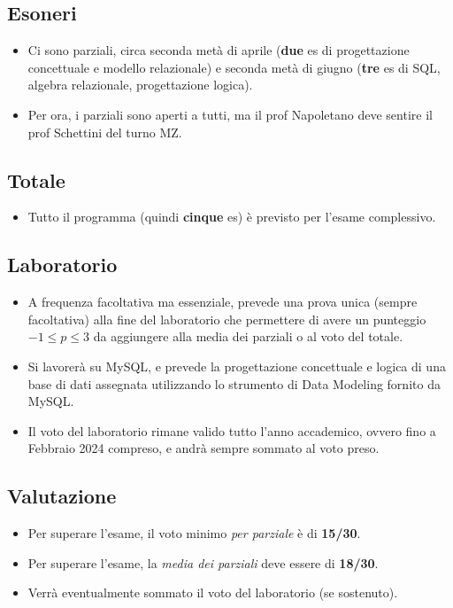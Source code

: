 \subsection{Esoneri}
\begin{itemize}
    \item Ci sono parziali, circa seconda metà di aprile (\textbf{due} es di progettazione concettuale e modello relazionale) e seconda metà di giugno (\textbf{tre} es di SQL, algebra relazionale, progettazione logica).
    \item Per ora, i parziali sono aperti a tutti, ma il prof Napoletano deve sentire il prof Schettini del turno MZ.
\end{itemize}

\subsection{Totale}
\begin{itemize}
    \item Tutto il programma (quindi \textbf{cinque} es) è previsto per l'esame complessivo.
\end{itemize}

\subsection{Laboratorio}
\begin{itemize}
    \item A frequenza facoltativa ma essenziale, prevede una prova unica (sempre facoltativa) alla fine del laboratorio che permettere di avere un punteggio $-1 \leq p \leq 3$ da aggiungere alla media dei parziali o al voto del totale.
    \item Si lavorerà su MySQL, e prevede la progettazione concettuale e logica di una base di dati assegnata utilizzando lo strumento di Data Modeling fornito da MySQL.
    \item Il voto del laboratorio rimane valido tutto l'anno accademico, ovvero fino a Febbraio 2024 compreso, e andrà sempre sommato al voto preso.
\end{itemize}

\subsection{Valutazione}
\begin{itemize}
    \item Per superare l'esame, il voto minimo \textit{per parziale} è di \textbf{15/30}.
    \item Per superare l'esame, la \textit{media dei parziali} deve essere di \textbf{18/30}.
    \item Verrà eventualmente sommato il voto del laboratorio (se sostenuto).
\end{itemize}

